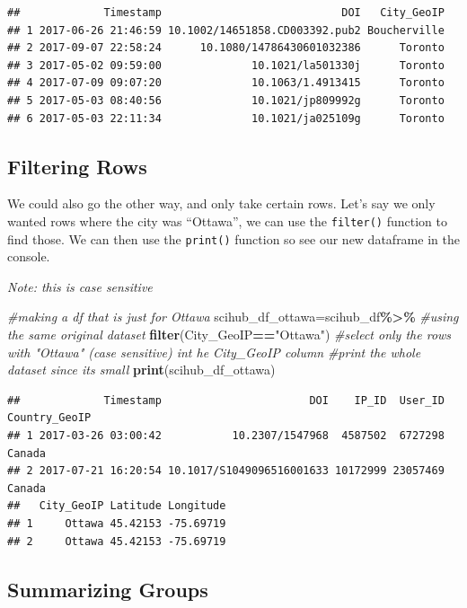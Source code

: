\documentclass[
]{article}
\newenvironment{Shaded}{\begin{snugshade}}{\end{snugshade}}
\newcommand{\CommentTok}[1]{\textcolor[rgb]{0.56,0.35,0.01}{\textit{#1}}}
\newcommand{\FunctionTok}[1]{\textcolor[rgb]{0.13,0.29,0.53}{\textbf{#1}}}
\newcommand{\NormalTok}[1]{#1}
\newcommand{\OtherTok}[1]{\textcolor[rgb]{0.56,0.35,0.01}{#1}}
\newcommand{\SpecialCharTok}[1]{\textcolor[rgb]{0.81,0.36,0.00}{\textbf{#1}}}
\newcommand{\StringTok}[1]{\textcolor[rgb]{0.31,0.60,0.02}{#1}}
\begin{document}
\begin{verbatim}
##             Timestamp                            DOI   City_GeoIP
## 1 2017-06-26 21:46:59 10.1002/14651858.CD003392.pub2 Boucherville
## 2 2017-09-07 22:58:24      10.1080/14786430601032386      Toronto
## 3 2017-05-02 09:59:00              10.1021/la501330j      Toronto
## 4 2017-07-09 09:07:20              10.1063/1.4913415      Toronto
## 5 2017-05-03 08:40:56              10.1021/jp809992g      Toronto
## 6 2017-05-03 22:11:34              10.1021/ja025109g      Toronto
\end{verbatim}

\subsection{Filtering Rows}\label{filtering-rows}

We could also go the other way, and only take certain rows. Let's say we
only wanted rows where the city was ``Ottawa'', we can use the
\texttt{filter()} function to find those. We can then use the
\texttt{print()} function so see our new dataframe in the console.

\emph{Note: this is case sensitive}

\begin{Shaded}
\begin{Highlighting}[]
\CommentTok{\#making a df that is just for Ottawa}
\NormalTok{scihub\_df\_ottawa}\OtherTok{=}\NormalTok{scihub\_df}\SpecialCharTok{\%\textgreater{}\%} \CommentTok{\#using the same original dataset}
  \FunctionTok{filter}\NormalTok{(City\_GeoIP}\SpecialCharTok{==}\StringTok{"Ottawa"}\NormalTok{) }\CommentTok{\#select only the rows with "Ottawa" (case sensitive) int he City\_GeoIP column}
\CommentTok{\#print the whole dataset since it\textquotesingle{}s small}
\FunctionTok{print}\NormalTok{(scihub\_df\_ottawa)}
\end{Highlighting}
\end{Shaded}

\begin{verbatim}
##             Timestamp                       DOI    IP_ID  User_ID Country_GeoIP
## 1 2017-03-26 03:00:42           10.2307/1547968  4587502  6727298        Canada
## 2 2017-07-21 16:20:54 10.1017/S1049096516001633 10172999 23057469        Canada
##   City_GeoIP Latitude Longitude
## 1     Ottawa 45.42153 -75.69719
## 2     Ottawa 45.42153 -75.69719
\end{verbatim}

\subsection{Summarizing Groups}\label{summarizing-groups}
\end{document}

